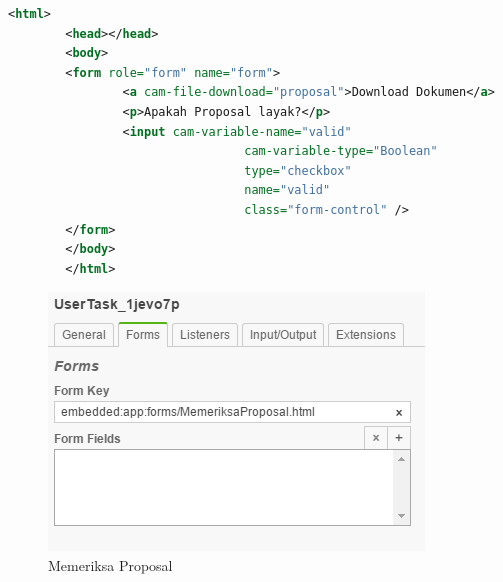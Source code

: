 \begin{enumerate}
\begin{enumerate}
	
	\begin{lstlisting}[language=xml,basicstyle=\tiny,caption=MemeriksaProposal.html]
		<html>
		<head></head>
		<body>
		<form role="form" name="form">
				<a cam-file-download="proposal">Download Dokumen</a>
				<p>Apakah Proposal layak?</p>
				<input cam-variable-name="valid"
								 cam-variable-type="Boolean"
								 type="checkbox"
								 name="valid"
								 class="form-control" />		
		</form> 
		</body>
		</html>
	\end{lstlisting}
	
	\begin{figure}[H]
			\centering
			\includegraphics[scale=1]{Gambar/Bab-3/Kasus1/4form2}
			\caption{Memeriksa Proposal} 
			\label{fig:pengajuanproposal_memeriksaproposalhtml}
	\end{figure}

\end{enumerate}


\end{enumerate}
